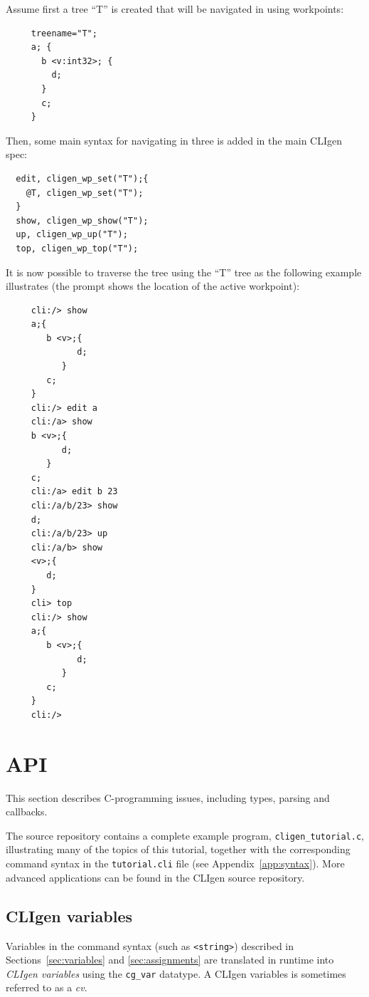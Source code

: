 \documentclass[a4paper, 10pt] {article}
\begin{document}
Assume first a tree ``T'' is created that will be navigated in using workpoints:
\begin{verbatim}
     treename="T";
     a; {
       b <v:int32>; {
         d;
       }
       c;
     }
\end{verbatim}

Then, some main syntax for navigating in three is added in the main CLIgen spec:

\begin{verbatim}
  edit, cligen_wp_set("T");{
    @T, cligen_wp_set("T");
  }
  show, cligen_wp_show("T");
  up, cligen_wp_up("T");
  top, cligen_wp_top("T");
\end{verbatim}

It is now possible to traverse the tree using the ``T'' tree as the following example illustrates (the prompt shows the location of the active workpoint):
\begin{verbatim}
     cli:/> show
     a;{
        b <v>;{
              d;
           }
        c;
     }
     cli:/> edit a
     cli:/a> show
     b <v>;{
           d;
        }
     c;
     cli:/a> edit b 23
     cli:/a/b/23> show
     d;
     cli:/a/b/23> up
     cli:/a/b> show
     <v>;{
        d;
     }
     cli> top
     cli:/> show
     a;{
        b <v>;{
              d;
           }
        c;
     }
     cli:/>
\end{verbatim}

\section{API}
\label{sec:api}
This section describes C-programming issues, including types, parsing and
callbacks.

The source repository contains a complete example program, {\tt cligen\_tutorial.c},
illustrating many of the topics of this tutorial, together with the
corresponding command syntax in the {\tt tutorial.cli} file (see
Appendix~\ref{app:syntax}).  More advanced applications can be found
in the CLIgen source repository.

\subsection{CLIgen variables}

Variables in the command syntax (such as {\tt <string>}) described in
Sections~\ref{sec:variables} and \ref{sec:assignments} are translated
in runtime into \emph{CLIgen variables} using the {\tt cg\_var}
datatype.  A CLIgen variables is sometimes referred to as a \emph{cv}.
\end{document}
